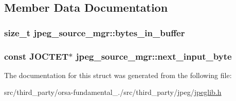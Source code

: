 \subsection{Member Data Documentation}
\hypertarget{structjpeg__source__mgr_a8ecb72557c1c9666d77fffea074282a4}{}
\subsubsection[{bytes\+\_\+in\+\_\+buffer}]{\setlength{\rightskip}{0pt plus 5cm}size\+\_\+t jpeg\+\_\+source\+\_\+mgr\+::bytes\+\_\+in\+\_\+buffer}\label{structjpeg__source__mgr_a8ecb72557c1c9666d77fffea074282a4}
\hypertarget{structjpeg__source__mgr_aad884e7f4ba7496ab0f56c942c7585c1}{}
\subsubsection[{next\+\_\+input\+\_\+byte}]{\setlength{\rightskip}{0pt plus 5cm}const {\bf J\+O\+C\+T\+E\+T}$\ast$ jpeg\+\_\+source\+\_\+mgr\+::next\+\_\+input\+\_\+byte}\label{structjpeg__source__mgr_aad884e7f4ba7496ab0f56c942c7585c1}


The documentation for this struct was generated from the following file\+:\begin{DoxyCompactItemize}
\item 
src/third\+\_\+party/orsa-\/fundamental\+\_./src/third\+\_\+party/jpeg/\hyperlink{jpeglib_8h}{jpeglib.\+h}\end{DoxyCompactItemize}
